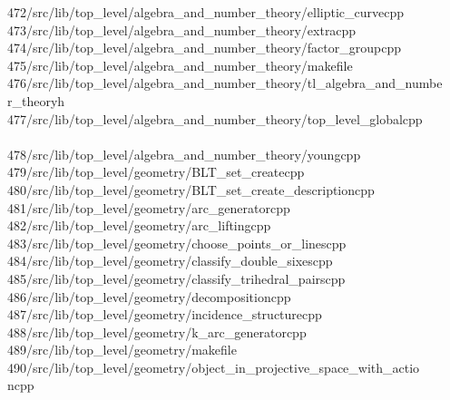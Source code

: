 \begin{tabbing}
472\>/src/lib/top\_level/algebra\_and\_number\_theory/elliptic\_curvecpp\\[0pt]
473\>/src/lib/top\_level/algebra\_and\_number\_theory/extracpp\\[0pt]
474\>/src/lib/top\_level/algebra\_and\_number\_theory/factor\_groupcpp\\[0pt]
475\>/src/lib/top\_level/algebra\_and\_number\_theory/makefile\\[0pt]
476\>/src/lib/top\_level/algebra\_and\_number\_theory/tl\_algebra\_and\_numbe\\[0pt]
\>r\_theoryh\\[0pt]
477\>/src/lib/top\_level/algebra\_and\_number\_theory/top\_level\_globalcpp\\[0pt]
\>\\[0pt]
478\>/src/lib/top\_level/algebra\_and\_number\_theory/youngcpp\\[0pt]
479\>/src/lib/top\_level/geometry/BLT\_set\_createcpp\\[0pt]
480\>/src/lib/top\_level/geometry/BLT\_set\_create\_descriptioncpp\\[0pt]
481\>/src/lib/top\_level/geometry/arc\_generatorcpp\\[0pt]
482\>/src/lib/top\_level/geometry/arc\_liftingcpp\\[0pt]
483\>/src/lib/top\_level/geometry/choose\_points\_or\_linescpp\\[0pt]
484\>/src/lib/top\_level/geometry/classify\_double\_sixescpp\\[0pt]
485\>/src/lib/top\_level/geometry/classify\_trihedral\_pairscpp\\[0pt]
486\>/src/lib/top\_level/geometry/decompositioncpp\\[0pt]
487\>/src/lib/top\_level/geometry/incidence\_structurecpp\\[0pt]
488\>/src/lib/top\_level/geometry/k\_arc\_generatorcpp\\[0pt]
489\>/src/lib/top\_level/geometry/makefile\\[0pt]
490\>/src/lib/top\_level/geometry/object\_in\_projective\_space\_with\_actio\\[0pt]
\>ncpp\\[0pt]

\end{tabbing}

